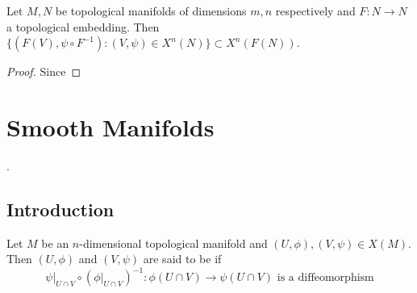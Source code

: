 \documentclass{book}
\begin{document}
\begin{defn}
	Let $M, N$ be topological manifolds of dimensions $m, n$ respectively and $F:N \rightarrow N$ a topological embedding. Then $\{(F(V), \psi \circ F^{-1}): (V, \psi) \in X^n(N)\} \subset X^n(F(N))$. 
\end{defn}

\begin{proof}
	Since 
\end{proof}





























	
	
	
	
	
	
	
	
	
	
	
	
	
	
	
	
	
	
	
	\newpage
	
	\chapter{Smooth Manifolds}
	
	.
	
	\section{Introduction}

	\begin{defn} 
		Let $M$ be an $n$-dimensional topological manifold and $(U, \phi), (V, \psi) \in X(M)$. Then $(U, \phi)$ and $(V, \psi)$ are said to be  if $$\psi|_{U \cap V} \circ (\phi|_{U \cap V})^{-1}: \phi(U \cap V) \rightarrow \psi (U \cap V) \text{ is a diffeomorphism}$$ 
	\end{defn}
\end{document}
